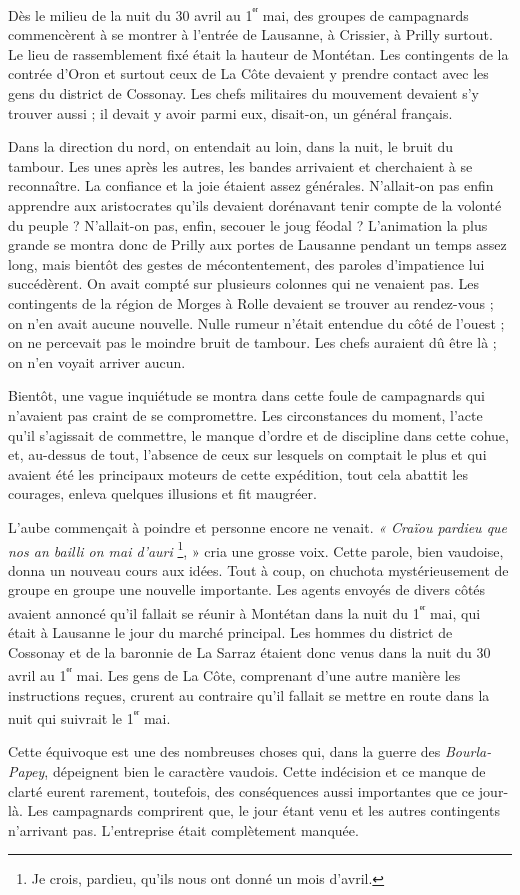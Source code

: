\documentclass[french,twoside]{book} %
\begin{document}
\noindent Dès le milieu de la nuit du 30 avril au 1\textsuperscript{ᵉʳ} mai, des groupes de campagnards commencèrent à se montrer à l’entrée de Lausanne, à Crissier, à Prilly surtout. Le lieu de rassemblement fixé était la hauteur de Montétan. Les contingents de la contrée d’Oron et surtout ceux de La Côte devaient y prendre contact avec les gens du district de Cossonay. Les chefs militaires du mouvement devaient s’y trouver aussi ; il devait y avoir parmi eux, disait-on, un général français.\par
Dans la direction du nord, on entendait au loin, dans la nuit, le bruit du tambour. Les unes après les autres, les bandes arrivaient et cherchaient à se reconnaître. La confiance et la joie étaient assez générales. N’allait-on pas enfin apprendre aux aristocrates qu’ils devaient dorénavant tenir compte de la volonté du peuple ? N’allait-on pas, enfin, secouer le joug féodal ? L’animation la plus grande se montra donc de Prilly aux portes de Lausanne pendant un temps assez long, mais bientôt des gestes de mécontentement, des paroles d’impatience lui succédèrent. On avait compté sur plusieurs colonnes qui ne venaient pas. Les contingents de la région de Morges à Rolle devaient se trouver au rendez-vous ; on n’en avait aucune nouvelle. Nulle rumeur n’était entendue du côté de l’ouest ; on ne percevait pas le moindre bruit de tambour. Les chefs auraient dû être là ; on n’en voyait arriver aucun.\par
Bientôt, une vague inquiétude se montra dans cette foule de campagnards qui n’avaient pas craint de se compromettre. Les circonstances du moment, l’acte qu’il s’agissait de commettre, le manque d’ordre et de discipline dans cette cohue, et, au-dessus de tout, l’absence de ceux sur lesquels on comptait le plus et qui avaient été les principaux moteurs de cette expédition, tout cela abattit les courages, enleva quelques illusions et fit maugréer.\par
L’aube commençait à poindre et personne encore ne venait. \emph{« Craïou pardieu que nos an bailli on mai d’auri} \footnote{Je crois, pardieu, qu’ils nous ont donné un mois d’avril.}, » cria une grosse voix. Cette parole, bien vaudoise, donna un nouveau cours aux idées. Tout à coup, on chuchota mystérieusement de groupe en groupe une nouvelle importante. Les agents envoyés de divers côtés avaient annoncé qu’il fallait se réunir à Montétan dans la nuit du 1\textsuperscript{ᵉʳ} mai, qui était à Lausanne le jour du marché principal. Les hommes du district de Cossonay et de la baronnie de La Sarraz étaient donc venus dans la nuit du 30 avril au 1\textsuperscript{ᵉʳ} mai. Les gens de La Côte, comprenant d’une autre manière les instructions reçues, crurent au contraire qu’il fallait se mettre en route dans la nuit qui suivrait le 1\textsuperscript{ᵉʳ} mai.\par
Cette équivoque est une des nombreuses choses qui, dans la guerre des \emph{Bourla-Papey}, dépeignent bien le caractère vaudois. Cette indécision et ce manque de clarté eurent rarement, toutefois, des conséquences aussi importantes que ce jour-là. Les campagnards comprirent que, le jour étant venu et les autres contingents n’arrivant pas. L’entreprise était complètement manquée.\par
\end{document}

